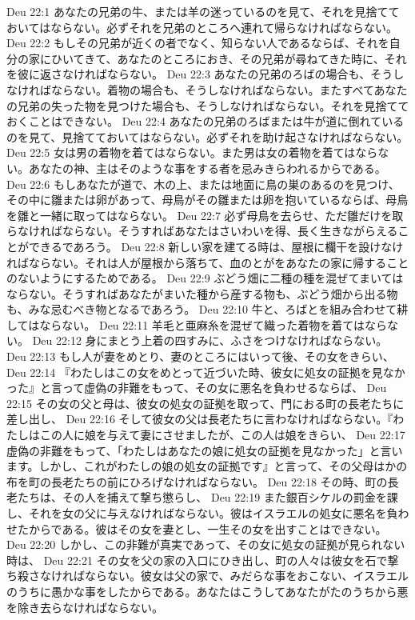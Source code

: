 Deu 22:1  あなたの兄弟の牛、または羊の迷っているのを見て、それを見捨てておいてはならない。必ずそれを兄弟のところへ連れて帰らなければならない。
Deu 22:2  もしその兄弟が近くの者でなく、知らない人であるならば、それを自分の家にひいてきて、あなたのところにおき、その兄弟が尋ねてきた時に、それを彼に返さなければならない。
Deu 22:3  あなたの兄弟のろばの場合も、そうしなければならない。着物の場合も、そうしなければならない。またすべてあなたの兄弟の失った物を見つけた場合も、そうしなければならない。それを見捨てておくことはできない。
Deu 22:4  あなたの兄弟のろばまたは牛が道に倒れているのを見て、見捨てておいてはならない。必ずそれを助け起さなければならない。
Deu 22:5  女は男の着物を着てはならない。また男は女の着物を着てはならない。あなたの神、主はそのような事をする者を忌みきらわれるからである。
Deu 22:6  もしあなたが道で、木の上、または地面に鳥の巣のあるのを見つけ、その中に雛または卵があって、母鳥がその雛または卵を抱いているならば、母鳥を雛と一緒に取ってはならない。
Deu 22:7  必ず母鳥を去らせ、ただ雛だけを取らなければならない。そうすればあなたはさいわいを得、長く生きながらえることができるであろう。
Deu 22:8  新しい家を建てる時は、屋根に欄干を設けなければならない。それは人が屋根から落ちて、血のとがをあなたの家に帰することのないようにするためである。
Deu 22:9  ぶどう畑に二種の種を混ぜてまいてはならない。そうすればあなたがまいた種から産する物も、ぶどう畑から出る物も、みな忌むべき物となるであろう。
Deu 22:10  牛と、ろばとを組み合わせて耕してはならない。
Deu 22:11  羊毛と亜麻糸を混ぜて織った着物を着てはならない。
Deu 22:12  身にまとう上着の四すみに、ふさをつけなければならない。
Deu 22:13  もし人が妻をめとり、妻のところにはいって後、その女をきらい、
Deu 22:14  『わたしはこの女をめとって近づいた時、彼女に処女の証拠を見なかった』と言って虚偽の非難をもって、その女に悪名を負わせるならば、
Deu 22:15  その女の父と母は、彼女の処女の証拠を取って、門におる町の長老たちに差し出し、
Deu 22:16  そして彼女の父は長老たちに言わなければならない。『わたしはこの人に娘を与えて妻にさせましたが、この人は娘をきらい、
Deu 22:17  虚偽の非難をもって、「わたしはあなたの娘に処女の証拠を見なかった」と言います。しかし、これがわたしの娘の処女の証拠です』と言って、その父母はかの布を町の長老たちの前にひろげなければならない。
Deu 22:18  その時、町の長老たちは、その人を捕えて撃ち懲らし、
Deu 22:19  また銀百シケルの罰金を課し、それを女の父に与えなければならない。彼はイスラエルの処女に悪名を負わせたからである。彼はその女を妻とし、一生その女を出すことはできない。
Deu 22:20  しかし、この非難が真実であって、その女に処女の証拠が見られない時は、
Deu 22:21  その女を父の家の入口にひき出し、町の人々は彼女を石で撃ち殺さなければならない。彼女は父の家で、みだらな事をおこない、イスラエルのうちに愚かな事をしたからである。あなたはこうしてあなたがたのうちから悪を除き去らなければならない。
